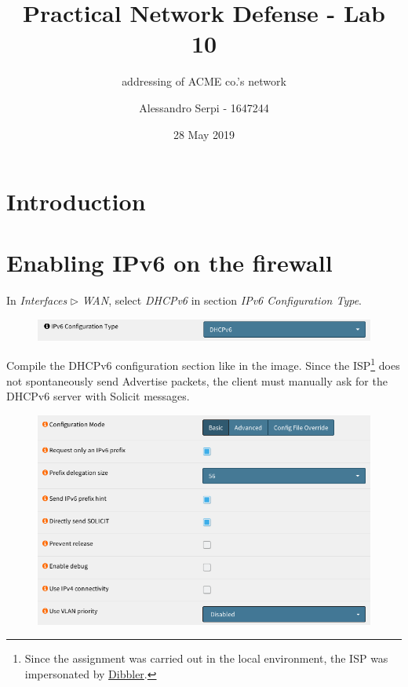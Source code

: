 \documentclass[draft]{homework}
\title{Practical Network Defense - Lab 10}
\subtitle{\ip addressing of ACME co.’s network}
\author{Alessandro Serpi - 1647244}
\date{28 May 2019}
\newcommand{\dhcp}{DHCPv6\xspace}
\newcommand{\ip}{IPv6\xspace}
\newcommand{\isp}{ISP\xspace}
\begin{document}
    \maketitle
    \tableofcontents
    
    
    \pagebreak
    \section{Introduction}
    
    
    \section{Enabling \ip on the firewall}
    In \textit{Interfaces} $\triangleright$ \textit{WAN}, select \textit{\dhcp} in section \textit{\ip Configuration Type}.
    \begin{figure}[H]
        \centering
        \includegraphics[width=\linewidth]{images/wan-ipv6}
        \label{fig:wan-ipv6}
    \end{figure}
    \vspace{-15pt}
    
    Compile the \dhcp configuration section like in the image.
    Since the \isp\footnote{Since the assignment was carried out in the local environment, the \isp was impersonated by \href{https://klub.com.pl/dhcpv6/}{Dibbler}.} does not spontaneously send Advertise packets, the client must manually ask for the \dhcp server with Solicit messages.
    \begin{figure}[H]
        \centering
        \includegraphics[width=\linewidth]{images/wan-dhcp}
        \label{fig:wan-dhcp}
    \end{figure}
    \vspace{-25pt}
    
\end{document}

